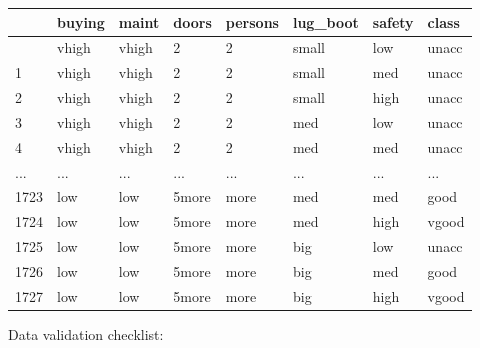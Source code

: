 \documentclass[
  letterpaper,
  DIV=11,
  numbers=noendperiod]{scrartcl}
\begin{document}
\begin{longtable}[]{@{}llllllll@{}}
\toprule\noalign{}
& buying & maint & doors & persons & lug\_boot & safety & class \\
\midrule\noalign{}
\endhead
\bottomrule\noalign{}
\endlastfoot
0 & vhigh & vhigh & 2 & 2 & small & low & unacc \\
1 & vhigh & vhigh & 2 & 2 & small & med & unacc \\
2 & vhigh & vhigh & 2 & 2 & small & high & unacc \\
3 & vhigh & vhigh & 2 & 2 & med & low & unacc \\
4 & vhigh & vhigh & 2 & 2 & med & med & unacc \\
... & ... & ... & ... & ... & ... & ... & ... \\
1723 & low & low & 5more & more & med & med & good \\
1724 & low & low & 5more & more & med & high & vgood \\
1725 & low & low & 5more & more & big & low & unacc \\
1726 & low & low & 5more & more & big & med & good \\
1727 & low & low & 5more & more & big & high & vgood \\
\end{longtable}

Data validation checklist:
\end{document}
